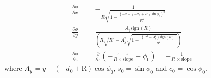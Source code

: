 \documentclass{article}
\def\R{\ensuremath{\mathrm{R}}}
\def\slope{\ensuremath{\mathrm{slope}}}
\def\sign#1{\ensuremath{\mathrm{sign}\left(#1\right)}}
\def\signR{\sign{\R}}
\def\partder#1#2{\ensuremath{\frac{\partial #1}{\partial #2}}}
\begin{document}
\begin{eqnarray}
\partder{\phi}{x} &=& -\frac{1}{R \sqrt{1 - \frac{(-x + (-d_0 + R) \sin\phi_0)^2}{ R^2}}} \\
\partder{\phi}{y} &=& \frac{A_y \sign{R}}{(R \sqrt{ R^2 - A_y^2} \sqrt{ 1 - \frac{ (R^2 - A_y^2) \sign{R}^2} {R^2} } )} \\
\partder{\phi}{z} &=& \partder{}{z}\left( -\frac{z-z_0}{R\times\slope} + \phi_0 \right) =  -\frac{1}{R\times\slope} 
\end{eqnarray}
where $A_y = y + (-d_0 + \R) \cos\phi_0$, $s_0=\sin\phi_0$ and $c_0=\cos\phi_0$.
\end{document}

